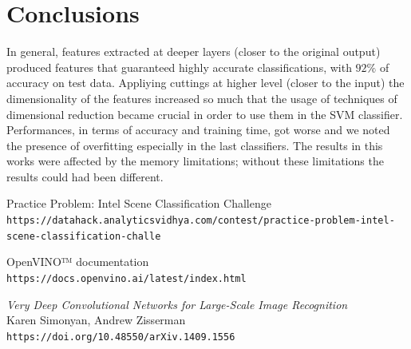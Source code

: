 \documentclass[compsoc]{IEEEtran}
\begin{document}
\section{Conclusions}
In general, features extracted at deeper layers (closer to the original output) produced features that guaranteed highly accurate classifications, with $92\%$ 
of accuracy on test data. Appliying cuttings at higher level (closer to the input) the dimensionality of the features increased so much that the usage of techniques of  dimensional reduction became crucial in order to use them in the SVM classifier. Performances, in terms of accuracy and training time, got worse and  we noted the presence of overfitting especially in the last classifiers. The results in this works were affected by the memory limitations; without these limitations the results could had been different.






\begin{thebibliography}{9}

Practice Problem: Intel Scene Classification Challenge \\
\texttt{https://datahack.analyticsvidhya.com/contest/practice-problem-intel-scene-classification-challe}

OpenVINO™ documentation \\
\texttt{https://docs.openvino.ai/latest/index.html}

\emph{Very Deep Convolutional Networks for Large-Scale Image Recognition} \\
Karen Simonyan, Andrew Zisserman \\
\texttt{https://doi.org/10.48550/arXiv.1409.1556}

\end{thebibliography}
\end{document}
